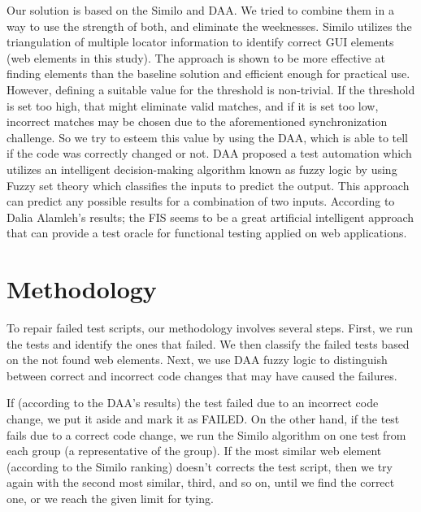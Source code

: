 \documentclass{article}
\begin{document}
Our solution is based on the Similo\cite{similo} and DAA\cite{fuzzy_ai_in_web_testing}. We tried to combine them in a way to use the strength of both, and eliminate the weeknesses. Similo\cite{similo} utilizes the triangulation of multiple locator information to identify correct GUI elements (web elements in this study). The approach is shown to be more effective at finding elements than the baseline solution and efficient enough for practical use. However, defining a suitable value for the threshold is non-trivial. If the threshold is set too high, that might eliminate valid matches, and if it is set too low, incorrect matches may be chosen due to the aforementioned synchronization challenge. So we try to esteem this value by using the DAA\cite{fuzzy_ai_in_web_testing}, which is able to tell if the code was correctly changed or not. DAA\cite{fuzzy_ai_in_web_testing} proposed a test automation which utilizes an intelligent decision-making algorithm known as fuzzy logic by using Fuzzy set theory which classifies the inputs to predict the output. This approach can predict any possible results for a combination of two inputs. According to Dalia Alamleh's results\cite{fuzzy_ai_in_web_testing}; the FIS seems to be a great artificial intelligent approach that can provide a test oracle for functional testing applied on web applications.

\maketitle

\section{Methodology}

To repair failed test scripts, our methodology involves several steps. First, we run the tests and identify the ones that failed. We then classify the failed tests based on the not found web elements. Next, we use DAA fuzzy logic\cite{fuzzy_ai_in_web_testing} to distinguish between correct and incorrect code changes that may have caused the failures.

If (according to the DAA's results) the test failed due to an incorrect code change, we put it aside and mark it as FAILED. On the other hand, if the test fails due to a correct code change, we run the Similo\cite{similo} algorithm on one test from each group (a representative of the group). If the most similar web element (according to the Similo\cite{similo} ranking) doesn't corrects the test script, then we try again with the second most similar, third, and so on, until we find the correct one, or we reach the given limit for tying. 
\end{document}
